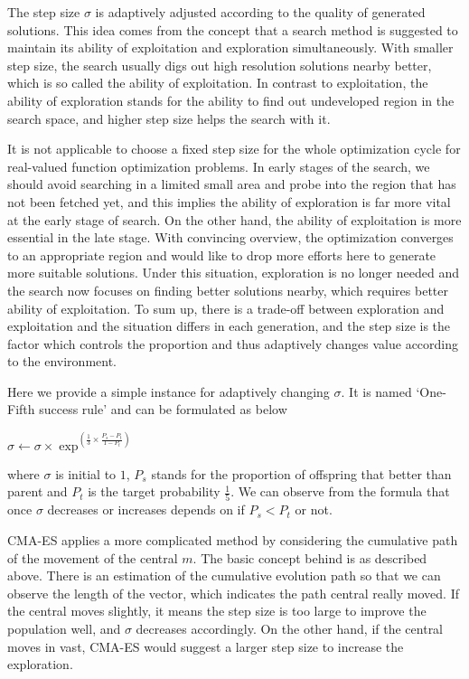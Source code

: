 The step size $\sigma$ is adaptively adjusted according to the quality
of generated solutions.  This idea comes from the concept that a search
method is suggested to maintain its ability of exploitation and
exploration simultaneously.  With smaller step size, the search usually
digs out high resolution solutions nearby better, which is so called the
ability of exploitation.  In contrast to exploitation, the ability of
exploration stands for the ability to find out undeveloped region in the
search space, and higher step size helps the search with it.

It is not applicable to choose a fixed step size for the whole
optimization cycle for real-valued function optimization problems.  In
early stages of the search, we should avoid searching in a limited small
area and probe into the region that has not been fetched yet, and this
implies the ability of exploration is far more vital at the early stage
of search.  On the other hand, the ability of exploitation is more
essential in the late stage.  With convincing overview, the optimization
converges to an appropriate region and would like to drop more efforts
here to generate more suitable solutions.  Under this situation,
exploration is no longer needed and the search now focuses on finding
better solutions nearby, which requires better ability of exploitation.
To sum up, there is a trade-off between exploration and exploitation and
the situation differs in each generation, and the step size is the
factor which controls the proportion and thus adaptively changes value
according to the environment.

Here we provide a simple instance for adaptively changing $\sigma$.  It
is named `One-Fifth success rule' and can be formulated as below

\begin{center} {\Large $\sigma \leftarrow \sigma \times \exp^{\left(
    \frac{1}{3} \times \frac{P_s-P_t}{1-P_t} \right)}$}\\ \end{center}
  where $\sigma$ is initial to $1$, $P_s$ stands for the proportion of
  offspring that better than parent and $P_t$ is the target probability
  $\frac{1}{5}$.  We can observe from the formula that once $\sigma$
  decreases or increases depends on if $P_s < P_t$ or not.

  CMA-ES applies a more complicated method by considering the cumulative
  path of the movement of the central $m$.  The basic concept behind is
  as described above.  There is an estimation of the cumulative
  evolution path so that we can observe the length of the vector, which
  indicates the path central really moved.  If the central moves
  slightly, it means the step size is too large to improve the
  population well, and $\sigma$ decreases accordingly.  On the other
  hand, if the central moves in vast, CMA-ES would suggest a larger step
  size to increase the exploration.


